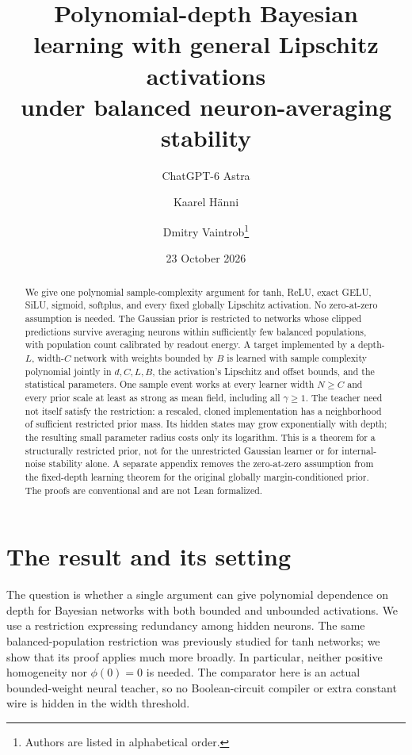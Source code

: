 \documentclass[11pt]{article}
\title{Polynomial-depth Bayesian learning with general Lipschitz activations\\under balanced neuron-averaging stability}
\author{ChatGPT-6 Astra \and Kaarel H\"anni \and Dmitry Vaintrob\thanks{Authors are listed in alphabetical order.}}
\date{23 October 2026}
\begin{document}
\maketitle
\begin{abstract}
We give one polynomial sample-complexity argument for tanh, ReLU, exact GELU,
SiLU, sigmoid, softplus, and every fixed globally Lipschitz activation. No
zero-at-zero assumption is needed. The Gaussian prior is restricted to networks
whose clipped predictions survive averaging neurons within sufficiently few
balanced populations, with population count calibrated by readout energy.
A target implemented by a depth-$L$, width-$C$ network with weights bounded by
$B$ is learned with sample complexity polynomial jointly in $d,C,L,B$, the
activation's Lipschitz and offset bounds, and the statistical parameters.
One sample event works at every learner width $N\ge C$ and every prior scale
at least as strong as mean field, including all $\gamma\ge1$. The teacher
need not itself satisfy the restriction: a rescaled, cloned implementation
has a neighborhood of sufficient restricted prior mass. Its hidden states
may grow exponentially with depth; the resulting small parameter radius
costs only its logarithm. This is a theorem for a structurally restricted
prior, not for the unrestricted Gaussian learner or for internal-noise
stability alone. A separate appendix removes the zero-at-zero assumption
from the fixed-depth learning theorem for the original globally
margin-conditioned prior. The proofs are conventional and are not Lean formalized.
\end{abstract}

\section{The result and its setting}
The question is whether a single argument can give polynomial dependence on
depth for Bayesian networks with both bounded and unbounded activations.
We use a restriction expressing redundancy among hidden neurons. The same
balanced-population restriction was previously studied for tanh networks;
we show that its proof applies much more broadly. In particular, neither
positive homogeneity nor $\phi(0)=0$ is needed. The comparator here is an
actual bounded-weight neural teacher, so no Boolean-circuit compiler or
extra constant wire is hidden in the width threshold.
\end{document}

